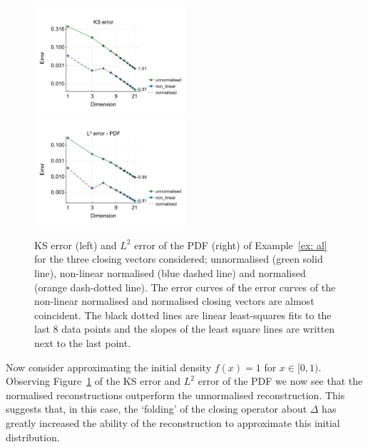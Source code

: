 \begin{example}\label{ex: al}
	\begin{figure}[h]
		\centering
		\includegraphics[width=0.5\textwidth,trim={0.5cm 0.8cm 0.2cm 1.25cm},clip]{chapter6/figs/qbdrap_closing_vec/fun4/ks_error_formatted.pdf}%
		\includegraphics[width=0.5\textwidth,trim={0.5cm 0.8cm 0.2cm 1.25cm},clip]{chapter6/figs/qbdrap_closing_vec/fun4/l2_pdf_error_formatted.pdf}
		\caption{KS error (left) and \(L^2\) error of the PDF (right) of Example~\ref{ex: al} for the three closing vectors considered; unnormalised (green solid line), non-linear normalised (blue dashed line) and normalised (orange dash-dotted line). The error curves of the error curves of the non-linear normalised and normalised closing vectors are almost coincident. The black dotted lines are linear least-squares fits to the last 8 data points and the slopes of the least square lines are written next to the last point.}
		\label{fig: fun 4 ks error qbdrap closing vecs}
	\end{figure}
	Now consider approximating the initial density \(f(x)=1\) for \(x\in[0,1)\). Observing Figure~\ref{fig: fun 4 ks error qbdrap closing vecs} of the KS error and \(L^2\) error of the PDF we now see that the normalised reconstructions outperform the unnormalised reconstruction. This suggests that, in this case, the `folding' of the closing operator about \(\Delta\) has greatly increased the ability of the reconstruction to approximate this initial distribution. 



\end{example}
